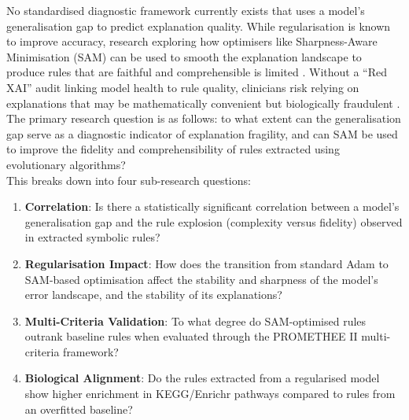 
\label{sec:problem}

No standardised diagnostic framework currently exists that uses a model's generalisation gap to
predict explanation quality. While regularisation is known to improve accuracy, research exploring
how optimisers like Sharpness-Aware Minimisation (SAM) can be used to smooth the explanation
landscape to produce rules that are faithful and comprehensible is limited
\cite{Dombrowski2022, Springer2024}. Without a ``Red XAI'' audit linking model health to rule
quality, clinicians risk relying on explanations that may be mathematically convenient but
biologically fraudulent \cite{Longo2024}.
\\
The primary research question is as follows: to what extent can the generalisation gap serve as a
diagnostic indicator of explanation fragility, and can SAM be used to improve the fidelity and
comprehensibility of rules extracted using evolutionary algorithms?
\\
This breaks down into four sub-research questions:

\begin{enumerate}
    \item \textbf{Correlation}: Is there a statistically significant correlation between a model's generalisation gap and the rule explosion (complexity versus fidelity) observed in extracted symbolic rules?
    \item \textbf{Regularisation Impact}: How does the transition from standard Adam to SAM-based optimisation affect the stability and sharpness of the model's error landscape, and the stability of its explanations?
    \item \textbf{Multi-Criteria Validation}: To what degree do SAM-optimised rules outrank baseline rules when evaluated through the PROMETHEE II multi-criteria framework?
    \item \textbf{Biological Alignment}: Do the rules extracted from a regularised model show higher enrichment in KEGG/Enrichr pathways compared to rules from an overfitted baseline?
\end{enumerate}

